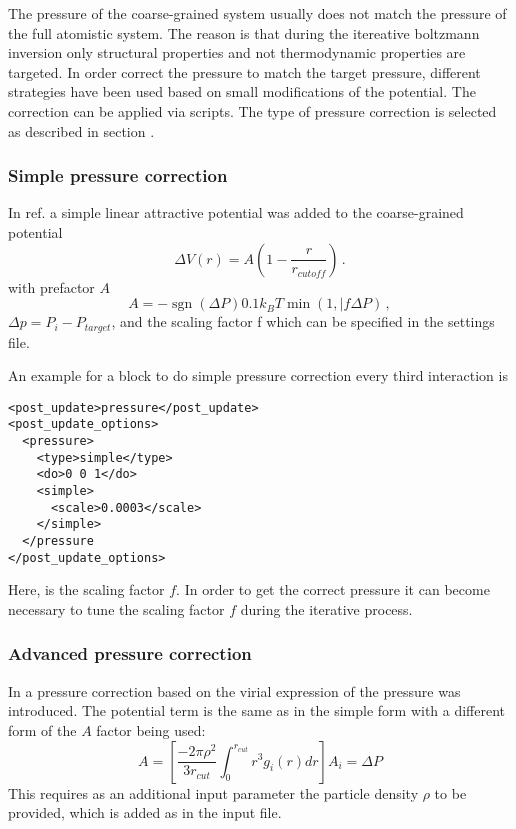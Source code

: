 The pressure of the coarse-grained system usually does not match the pressure of the full atomistic system. The reason is that during the itereative boltzmann inversion only structural properties and not thermodynamic properties are targeted. In order correct the pressure to match the target pressure, different strategies have been used based on small modifications of the potential. The correction can be applied via  scripts. The type of pressure correction is selected as described in section .


\subsubsection{Simple pressure correction}
In ref.\cite{Reith:2003} a simple linear attractive potential was added to the coarse-grained potential
\begin{equation}
  \Delta V(r)=A(1-\frac{r}{r_{cutoff}}) \,.
\end{equation}
with prefactor $A$
\begin{equation}
  A = -\operatorname{sgn}(\Delta P)0.1k_{B}T\min(1,|f\Delta P) \,,
\end{equation}
$\Delta p=P_i-P_{target}$, and the scaling factor f which can be specified in the settings file.

An example for a block to do simple pressure correction every third interaction is
\begin{lstlisting}
<post_update>pressure</post_update>
<post_update_options>
  <pressure>
    <type>simple</type>
    <do>0 0 1</do>
    <simple>
      <scale>0.0003</scale>
    </simple>
  </pressure
</post_update_options>
\end{lstlisting}
Here,  is the scaling factor $f$. In order to get the correct pressure it can become necessary to tune the scaling factor $f$ during the iterative process.

\subsubsection{Advanced pressure correction}
In \cite{Wang:2009} a pressure correction based on the virial expression of the pressure was introduced. The potential term is the same as in the simple form with a different form of the $A$ factor being used:
\begin{equation}
  A = \left[\frac{-2\pi\rho^{2}}{3r_{cut}}\int_{0}^{r_{cut}}r^{3}g_{i}(r)dr\right]A_{i}=\Delta P
\end{equation}
This requires as an additional input parameter the particle density $ \rho $ to be provided, which is added as   in the input file. 

